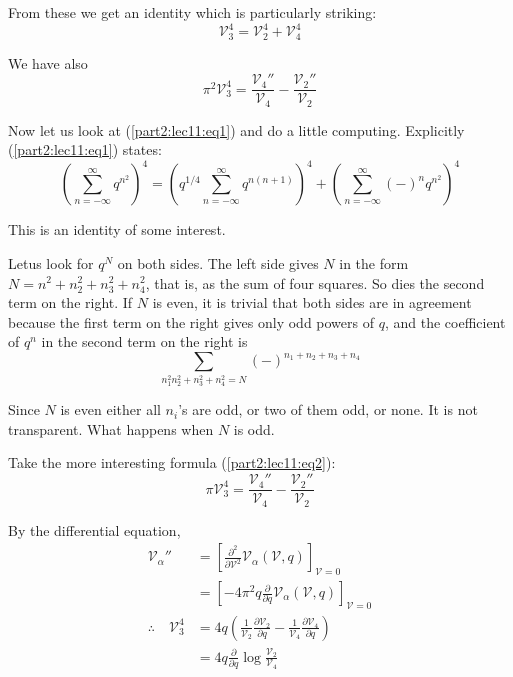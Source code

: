 From these we get an identity which is particularly striking:
\begin{equation*}
  \mathscr{V}_3^4 = \mathscr{V}_2^4 + \mathscr{V}_4^4
  \tag{1}\label{part2:lec11:eq1} 
\end{equation*}

We have also
\begin{equation*}
  \pi^2 \mathscr{V}_3^4 = \frac{\mathscr{V}_4''}{\mathscr{V}_4} -
  \frac{\mathscr{V}_2''}{\mathscr{V}_2}\tag{2}\label{part2:lec11:eq2} 
\end{equation*}

Now let us look at (\ref{part2:lec11:eq1}) and do a little
computing. Explicitly (\ref{part2:lec11:eq1}) 
states:
\begin{equation*}
  \left( \sum^\infty_{n=-\infty} q^{n^2}\right)^4 = \left( q^{1/4}
  \sum^\infty_{n=-\infty}q^{n(n+1)}\right)^4 + \left(
  \sum^\infty_{n=-\infty} (-)^n q^{n^2}\right)^4 \tag{3}\label{part2:lec11:eq3} 
\end{equation*}

This is an identity of some interest.

Let\pageoriginale us look for $q^N$ on both sides. The left side
gives $N$ in the form $N= n^2+n^2_2 + n_3^2 + n_4^2$, that is, as the
sum of four squares. So dies the second term on the right. If $N$ is
even, it is trivial that both sides are in agreement because the first
term on the right gives only odd powers of $q$, and the coefficient of
$q^n$ in the second term on the right is
$$
\sum_{n_1^2 n_2^2+ n_3^2 +n_4^2=N} (-)^{n_1+n_2+n_3+n_4}
$$ 

Since $N$ is even either all $n_i$'s are odd, or two of them odd,
or none. It is not transparent. What happens when $N$ is odd. 

Take the more interesting formula (\ref{part2:lec11:eq2}):
$$
\pi \mathscr{V}^4_3 = \frac{\mathscr{V}_4''}{\mathscr{V}_4} -
\frac{\mathscr{V}_2''}{\mathscr{V}_2} 
$$

By the differential equation,
\begin{align*}
  \mathscr{V}_\alpha'' & = \left[ \frac{\partial^2}{\partial
      \mathscr{V}^2} \mathscr{V}_\alpha (\mathscr{V},
    q)\right]_{\mathscr{V}=0}\\
  & = \left[ - 4 \pi^2 q \frac{\partial}{\partial q}
    \mathscr{V}_\alpha (\mathscr{V}, q)\right]_{\mathscr{V}=0}\\
  \therefore \quad \mathscr{V}_3^4 & = 4 q
  \left(\frac{1}{\mathscr{V}_2} \frac{\partial \mathscr{V}_2}{\partial
    q} - \frac{1}{\mathscr{V}_4} \frac{\partial
    \mathscr{V}_4}{\partial q} \right)\\
  & = 4q \frac{\partial}{\partial q} \log
  \frac{\mathscr{V}_2}{\mathscr{V}_4} 
\end{align*}

